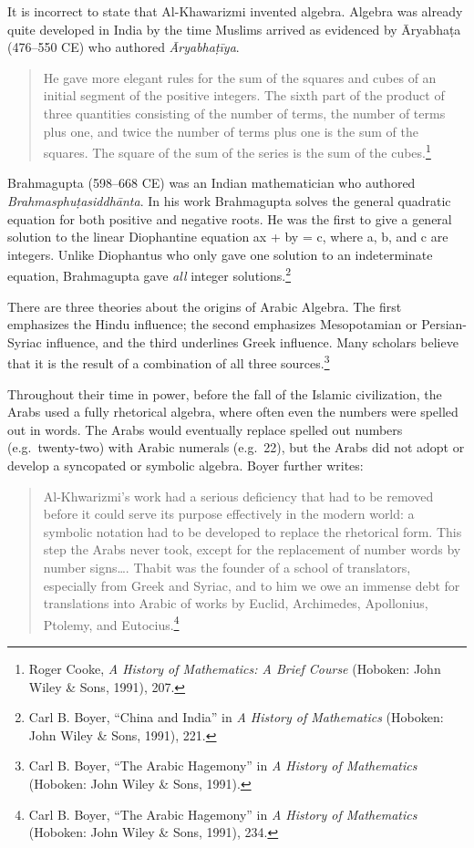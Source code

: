 It is incorrect to state that Al-Khawarizmi invented algebra. Algebra was already quite developed in India by the time Muslims arrived as evidenced by Āryabhaṭa (476–550 CE) who authored \textit{Āryabhaṭīya}. 
\begin{quote}
He gave more elegant rules for the sum of the squares and cubes of an initial segment of the positive integers. The sixth part of the product of three quantities consisting of the number of terms, the number of terms plus one, and twice the number of terms plus one is the sum of the squares. The square of the sum of the series is the sum of the cubes.\footnote{Roger Cooke, \textit{A History of Mathematics: A Brief Course} (Hoboken: John Wiley \& Sons, 1991), 207.}
\end{quote}
Brahmagupta (598--668 CE) was an Indian mathematician who authored \textit{Brahmasphuṭasiddhānta}. In his work Brahmagupta solves the general quadratic equation for both positive and negative roots. He was the first to give a general solution to the linear Diophantine equation ax + by = c, where a, b, and c are integers. Unlike Diophantus who only gave one solution to an indeterminate equation, Brahmagupta gave \textit{all} integer solutions.\footnote{Carl B. Boyer, “China 	and India” in \textit{A History of Mathematics}  (Hoboken: John Wiley \& Sons, 1991), 221.}

There are three theories about the origins of Arabic Algebra. The first emphasizes the Hindu influence; the second emphasizes Mesopotamian or Persian-Syriac influence, and the third underlines Greek influence. Many scholars believe that it is the result of a combination of all three sources.\footnote{Carl B. Boyer, “The 	Arabic Hagemony” in \textit{A History of Mathematics} (Hoboken: John Wiley \& Sons, 1991).} 

Throughout their time in power, before the fall of the Islamic civilization, the Arabs used a fully rhetorical algebra, where often even the numbers were spelled out in words. The Arabs would eventually replace spelled out numbers (e.g.\ twenty-two) with Arabic numerals (e.g.\ 22), but the Arabs did not adopt or develop a syncopated or symbolic algebra. Boyer further writes:
\begin{quote}
Al-Khwarizmi's work had a serious deficiency that had to be removed before it could serve its purpose effectively in the modern world: a symbolic notation had to be developed to replace the rhetorical form. This step the Arabs never took, except for the replacement of number words by number signs…. Thabit was the founder of a school of translators, especially from Greek and Syriac, and to him we owe an immense debt for translations into Arabic of works by Euclid, Archimedes, Apollonius, Ptolemy, and Eutocius.\footnote{Carl B. Boyer, “The Arabic Hagemony” in \textit{A History of Mathematics} (Hoboken: John Wiley \& Sons, 1991), 234.}
\end{quote}
